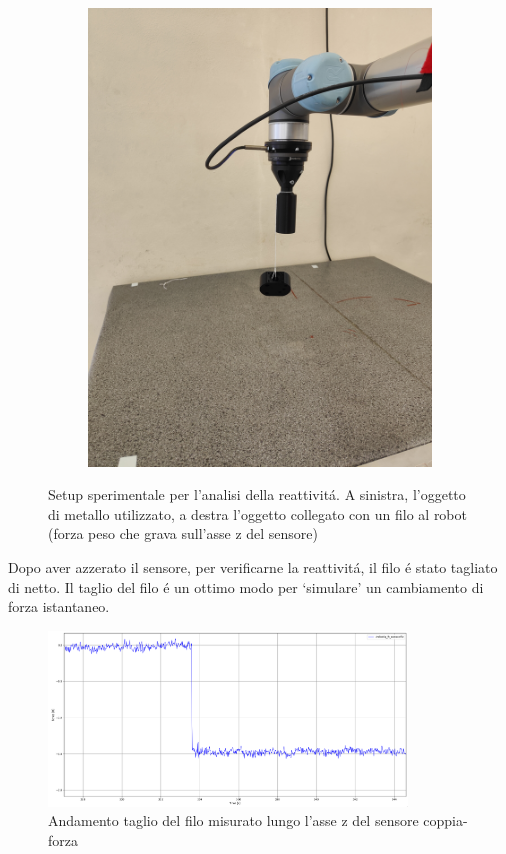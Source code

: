 \begin{figure}[H]
\begin{subfigure}[b]{0.4\textwidth}
        \includegraphics[width=\textwidth]{images/setup_z.jpg}
        \label{fig:setup}
    \end{subfigure}
    \caption{Setup sperimentale per l'analisi della reattivit\'{a}. A sinistra, l'oggetto di metallo utilizzato, 
    a destra l'oggetto collegato con un filo al robot (forza peso che grava sull'asse z del sensore)}\label{fig:setup_z}
\end{figure}
Dopo aver azzerato il sensore, per verificarne la reattivit\'{a}, il filo \'{e} stato tagliato di netto. 
Il taglio del filo \'{e} un ottimo modo per `simulare' un cambiamento di forza istantaneo.
\begin{figure}[H]
    \centering
    \includegraphics*[width=0.85\textwidth]{images/z_cut.png}
    \caption{Andamento taglio del filo misurato lungo l'asse z del sensore coppia-forza}
    \label{fig:z_cut}
\end{figure}
